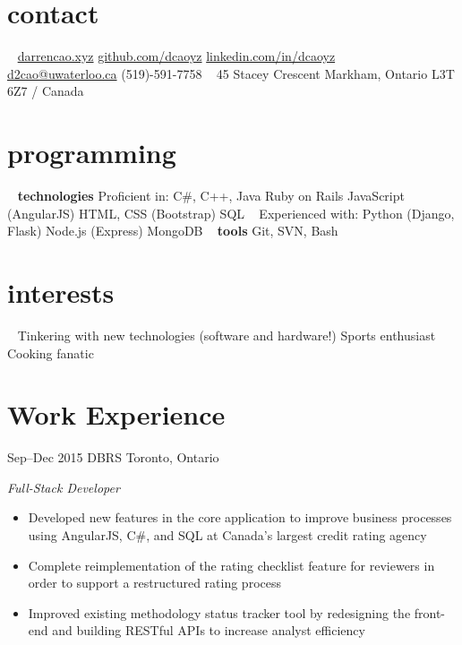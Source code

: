 \documentclass[print]{friggeri-cv} %
\begin{document}


\begin{aside}
\section{contact}
~
\href{http://darrencao.xyz}{darrencao.xyz}
\href{https://github.com/dcaoyz}{github.com/dcaoyz}
\href{https://ca.linkedin.com/in/dcaoyz}{linkedin.com/in/dcaoyz}
~
\href{mailto:d2cao@uwaterloo.ca}{d2cao@uwaterloo.ca}
(519)-591-7758
~
45 Stacey Crescent
Markham, Ontario
L3T 6Z7 / Canada
~
\section{programming}
~
{\textbf{technologies}
Proficient in:
C\#, C++, Java
Ruby on Rails
JavaScript (AngularJS)
HTML, CSS (Bootstrap)
SQL}
~
Experienced with:
Python (Django, Flask)
Node.js (Express)
MongoDB
~
\textbf{tools}
Git, SVN, Bash
~
\section{interests}
~
Tinkering with new technologies (software and hardware!)
Sports enthusiast
Cooking fanatic
\end{aside}


\section{Work Experience}


\begin{entrylist}
\entry
{Sep--Dec 2015}
{DBRS}
{Toronto, Ontario}
{\emph{Full-Stack Developer}
\begin{itemize}
\item Developed new features in the core application to improve business processes using AngularJS, C\#, and SQL at Canada's largest credit rating agency
\item Complete reimplementation of the rating checklist feature for reviewers in order to support a restructured rating process
\item Improved existing methodology status tracker tool by redesigning the front-end and building RESTful APIs to increase analyst efficiency \end{itemize}}
\end{entrylist}
\end{document}
